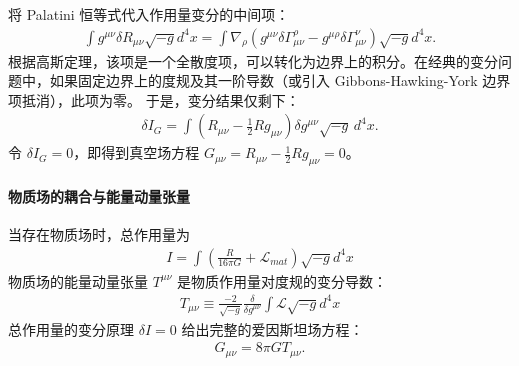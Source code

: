 将 Palatini 恒等式代入作用量变分的中间项：
\begin{align}
\int g^{\mu\nu} \delta R_{\mu\nu} \sqrt{-g} d^4x = \int \nabla_\rho (g^{\mu\nu} \delta \Gamma^\rho_{\mu\nu} - g^{\mu\rho} \delta \Gamma^\nu_{\mu\nu}) \sqrt{-g} d^4x.
\end{align}
根据高斯定理，该项是一个全散度项，可以转化为边界上的积分。在经典的变分问题中，如果固定边界上的度规及其一阶导数（或引入 Gibbons-Hawking-York 边界项抵消），此项为零。
于是，变分结果仅剩下：
\begin{align}
\delta I_G = \int \left( R_{\mu\nu} - \frac{1}{2} R g_{\mu\nu} \right) \delta g^{\mu\nu} \sqrt{-g} \, d^4x.
\end{align}
令 $\delta I_G = 0$，即得到真空场方程 $G_{\mu\nu} = R_{\mu\nu} - \frac{1}{2}Rg_{\mu\nu} = 0$。

\paragraph{物质场的耦合与能量动量张量}
当存在物质场时，总作用量为
\begin{align}
    I = \int \left(\frac{R}{16\pi G} + \mathcal{L}_{mat}\right)\sqrt{-g}d^4x
\end{align}
物质场的能量动量张量 $T^{\mu\nu}$ 是物质作用量对度规的变分导数：
\begin{align}
T_{\mu\nu} \equiv \frac{-2}{\sqrt{-g}} \frac{\delta }{\delta g^{\mu\nu}} \int \mathcal{L} \sqrt{-g} d^4x
\end{align}
总作用量的变分原理 $\delta I = 0$ 给出完整的爱因斯坦场方程：
\begin{align}
G_{\mu\nu} = 8\pi G T_{\mu\nu}.
\end{align}

